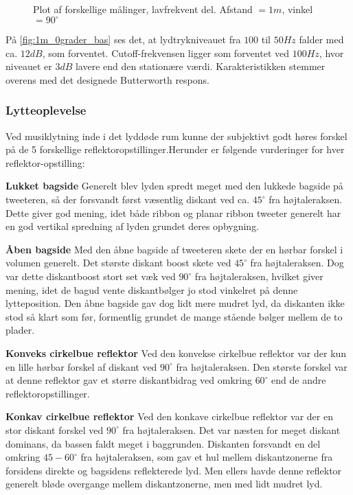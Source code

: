 \begin{figure}[H]
    \caption{Plot af forskellige målinger, lavfrekvent del. Afstand $= 1m$, vinkel $= 90 ^{\circ}$ }
    \label{fig:1m_0grader_bas}
\end{figure} 

På \autoref{fig:1m_0grader_bas} ses det, at lydtrykniveauet fra $100 $ til $50 Hz$ falder med ca. $12 dB$, som forventet. 
Cutoff-frekvensen ligger som forventet ved $100 Hz$, hvor niveauet er $3 dB$ lavere end den stationære værdi. 
Karakteristikken stemmer overens med det designede Butterworth respons.  

\subsubsection{Lytteoplevelse}

Ved musiklytning inde i det lyddøde rum kunne der subjektivt godt høres forskel på de 5 forskellige reflektoropstillinger.Herunder er følgende vurderinger for hver reflektor-opstilling:

\textbf{Lukket bagside} \newline
Generelt blev lyden spredt meget med den lukkede bagside på tweeteren, så der forsvandt først væsentlig diskant ved ca. $45 ^{\circ}$ fra højtaleraksen. Dette giver god mening, idet både ribbon og planar ribbon tweeter generelt har en god vertikal spredning af lyden grundet deres opbygning. 
 
\textbf{Åben bagside}\newline
Med den åbne bagside af tweeteren skete der en hørbar forskel i volumen generelt. Det største diskant boost skete ved $45 ^{\circ}$ fra højtaleraksen. Dog var dette diskantboost stort set væk ved $90 ^{\circ}$ fra højtaleraksen, hvilket giver mening, idet de bagud vente diskantbølger jo stod vinkelret på denne lytteposition. Den åbne bagside gav dog lidt mere mudret lyd, da diskanten ikke stod så klart som før, formentlig grundet de mange stående bølger mellem de to plader.

\textbf{Konveks cirkelbue reflektor}\newline
Ved den konvekse cirkelbue reflektor var der kun en lille hørbar forskel af diskant ved $90 ^{\circ}$ fra højtaleraksen. Den største forskel var at denne reflektor gav et større diskantbidrag ved omkring $60 ^{\circ}$ end de andre reflektoropstillinger. 

\textbf{Konkav cirkelbue reflektor}\newline
Ved den konkave cirkelbue reflektor var der en stor diskant forskel ved $90 ^{\circ}$ fra højtaleraksen. Det var næsten for meget diskant dominans, da bassen faldt meget i baggrunden. Diskanten forsvandt en del omkring $45-60 ^{\circ}$ fra højtaleraksen, som gav et hul mellem diskantzonerne fra forsidens direkte og bagsidens reflekterede lyd. Men ellers havde denne reflektor generelt bløde overgange mellem diskantzonerne, men med lidt mudret lyd.

